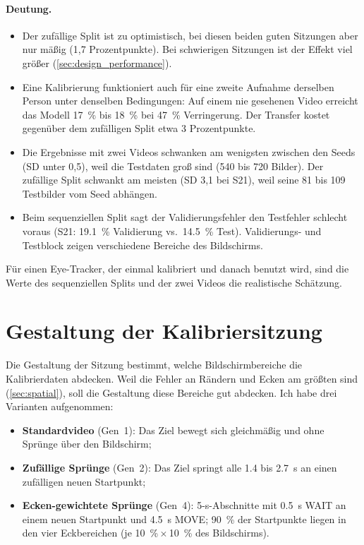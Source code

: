 \paragraph{Deutung.}
\begin{itemize}[nosep]
  \item Der zufällige Split ist zu optimistisch, bei diesen beiden guten
        Sitzungen aber nur mäßig (1,7 Prozentpunkte). Bei schwierigen
        Sitzungen ist der Effekt viel größer (\cref{sec:design_performance}).
  \item Eine Kalibrierung funktioniert auch für eine zweite Aufnahme derselben
        Person unter denselben Bedingungen: Auf einem nie gesehenen Video
        erreicht das Modell \SI{17}{\percent} bis \SI{18}{\percent} bei
        \SI{47}{\percent} Verringerung. Der Transfer kostet gegenüber dem
        zufälligen Split etwa 3 Prozentpunkte.
  \item Die Ergebnisse mit zwei Videos schwanken am wenigsten zwischen den
        Seeds (SD unter 0,5), weil die Testdaten groß sind (540 bis 720
        Bilder). Der zufällige Split schwankt am meisten (SD 3,1 bei S21), weil
        seine 81 bis 109 Testbilder vom Seed abhängen.
  \item Beim sequenziellen Split sagt der Validierungsfehler den Testfehler
        schlecht voraus (S21: \SI{19,1}{\percent} Validierung vs.\
        \SI{14,5}{\percent} Test). Validierungs- und Testblock zeigen
        verschiedene Bereiche des Bildschirms.
\end{itemize}
Für einen Eye-Tracker, der einmal kalibriert und danach benutzt wird, sind die
Werte des sequenziellen Splits und der zwei Videos die realistische Schätzung.

\section{Gestaltung der Kalibriersitzung}
\label{sec:session_design}

Die Gestaltung der Sitzung bestimmt, welche Bildschirmbereiche die
Kalibrierdaten abdecken. Weil die Fehler an Rändern und Ecken am größten sind
(\cref{sec:spatial}), soll die Gestaltung diese Bereiche gut abdecken. Ich
habe drei Varianten aufgenommen:
\begin{itemize}[nosep]
  \item \textbf{Standardvideo} (Gen~1): Das Ziel bewegt
        sich gleichmäßig und ohne Sprünge über den Bildschirm;
  \item \textbf{Zufällige Sprünge} (Gen~2): Das Ziel springt alle
        \SI{1,4}{} bis \SI{2,7}{\second} an einen zufälligen neuen
        Startpunkt;
  \item \textbf{Ecken-gewichtete Sprünge} (Gen~4):
        5-s-Abschnitte mit \SI{0,5}{\second} WAIT an einem neuen Startpunkt und
        \SI{4,5}{\second} MOVE; \SI{90}{\percent} der Startpunkte liegen in den
        vier Eckbereichen (je \SI{10}{\percent}\,$\times$\,\SI{10}{\percent}
        des Bildschirms).
\end{itemize}

